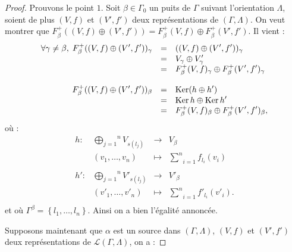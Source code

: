\documentclass[a4paper,10pt]{article}
\DeclareMathOperator{\Ker}{Ker}
\newcommand{\dps}{\displaystyle}
\begin{document}
\begin{proof}
	Prouvons le point $1$. Soit $\beta\in\Gamma_{0}$ un puits de $\Gamma$ suivant l'orientation $\Lambda$, soient de plus $(V,f)$ et $(V',f')$ deux représentations de $(\Gamma,\Lambda)$. On veut montrer que $F_{\beta}^{+}((V,f)\oplus(V',f'))=F_{\beta}^{+}(V,f)\oplus F_{\beta}^{+}(V',f')$. Il vient :
	\[
\begin{array}{>{\dps}r>{\dps}l>{\dps}l}
	\forall\gamma\neq\beta,\;F_{\beta}^{+}((V,f)\oplus(V',f'))_{\gamma}&=&((V,f)\oplus(V',f'))_{\gamma}\\
	&=& V_{\gamma}\oplus V_{\gamma}'\\
	&=&  F_{\beta}^{+}(V,f)_{\gamma}\oplus F_{\beta}^{+}(V',f')_{\gamma}\\
	&&\\
	F_{\beta}^{+}((V,f)\oplus(V',f'))_{\beta}&=&\Ker(h\oplus h')\\
	&=& \Ker h \oplus \Ker h'\\
	&=&  F_{\beta}^{+}(V,f)_{\beta}\oplus F_{\beta}^{+}(V',f')_{\beta},
\end{array}
	\]
où :
\[
\begin{array}{lccc}
	h : & \overset{n}{\underset{j=1}{\bigoplus}}V_{s(l_{j})}&\rightarrow & V_{\beta} \\ 
	& (v_{1},\dots,v_{n})&\mapsto & \underset{i=1}{\overset{n}{\sum}}f_{l_{i}}(v_{i})\\
	&&&\\
	h' : & \overset{n}{\underset{j=1}{\bigoplus}}V'_{s(l_{j})}&\rightarrow & V'_{\beta} \\ 
	& (v'_{1},\dots,v'_{n})&\mapsto & \underset{i=1}{\overset{n}{\sum}}f'_{l_{i}}(v'_{i}).\\
\end{array}
	\]
	et où $\Gamma^{\beta}=\left\{ l_{1},\dots,l_{n} \right\}$. Ainsi on a bien l'égalité annoncée.

Supposons maintenant que $\alpha$ est un source dans $(\Gamma,\Lambda)$, $(V,f)$ et $(V',f')$ deux représentations de $\mathscr L(\Gamma,\Lambda)$, on a : 


\end{proof}
\end{document}

